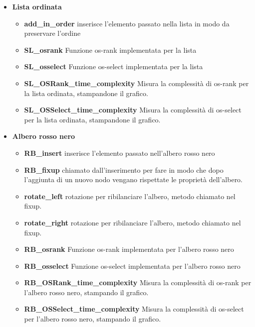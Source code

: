 \begin{itemize}
    \item \textbf{Lista ordinata}
    \begin{itemize}
    \item \textbf{add\_in\_order} inserisce l'elemento passato nella lista in modo da preservare l'ordine
    \item \textbf{SL\_osrank} Funzione os-rank implementata per la lista
    \item \textbf{SL\_osselect} Funzione os-select implementata per la lista
    \item \textbf{SL\_OSRank\_time\_complexity} Misura la complessità di os-rank per la lista ordinata, stampandone il grafico.
    \item \textbf{SL\_OSSelect\_time\_complexity} Misura la complessità di os-select per la lista ordinata, stampandone il grafico.
    \end{itemize}
    \item \textbf{Albero rosso nero}
    \begin{itemize}
        \item \textbf{RB\_insert} inserisce l'elemento passato nell'albero rosso nero
        \item \textbf{RB\_fixup} chiamato dall'inserimento per fare in modo che dopo l'aggiunta di un nuovo nodo vengano rispettate le proprietà dell'albero.
        \item \textbf{rotate\_left} rotazione per ribilanciare l'albero, metodo chiamato nel fixup.
        \item \textbf{rotate\_right} rotazione per ribilanciare l'albero, metodo chiamato nel fixup.
        \item \textbf{RB\_osrank} Funzione os-rank implementata per l'albero rosso nero
        \item \textbf{RB\_osselect} Funzione os-select implementata per l'albero rosso nero
        \item \textbf{RB\_OSRank\_time\_complexity}  Misura la complessità di os-rank per l'albero rosso nero, stampando il grafico.
        \item \textbf{RB\_OSSelect\_time\_complexity} Misura la complessità di os-select per l'albero rosso nero, stampando il grafico.  
    \end{itemize}
    

\end{itemize}
